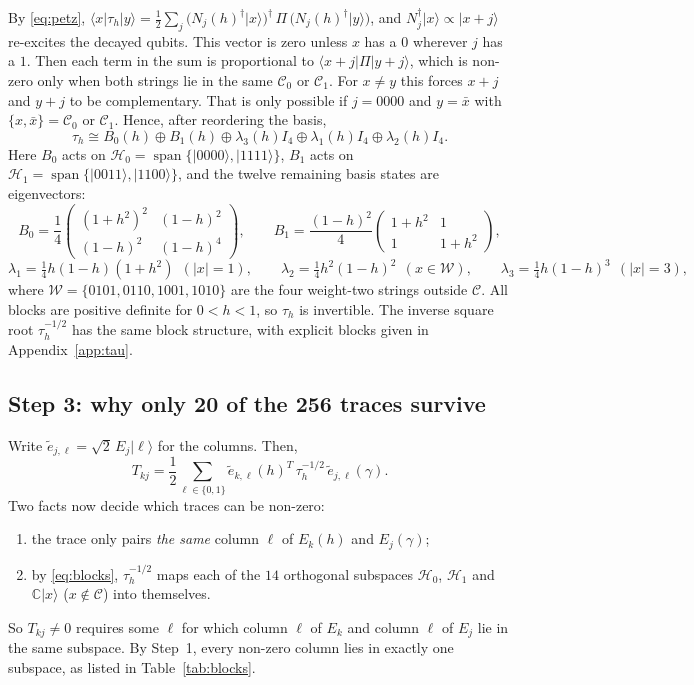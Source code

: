 \documentclass[11pt,a4paper]{article}
\theoremstyle{plain}
\newcommand{\ket}[1]{\lvert #1\rangle}
\newcommand{\bra}[1]{\langle #1\rvert}
\newcommand{\C}{\mathbb{C}}
\newcommand{\cC}{\mathcal{C}}
\newcommand{\cW}{\mathcal{W}}
\newcommand{\cH}{\mathcal{H}}
\newcommand{\wt}[1]{\lvert #1\rvert}
\begin{document}
By \eqref{eq:petz}, $\bra x\tau_h\ket y=\frac12\sum_j\big(N_j(h)^\dagger\ket x\big)^\dagger\,\Pi\,\big(N_j(h)^\dagger\ket y\big)$, and $N_j^\dagger\ket x\propto\ket{x+j}$ re-excites the decayed qubits. This vector is zero unless $x$ has a $0$ wherever $j$ has a $1$. Then each term in the sum is proportional to $\bra{x+j}\Pi\ket{y+j}$, which is non-zero only when both strings lie in the same $\cC_0$ or $\cC_1$. For $x\ne y$ this forces $x+j$ and $y+j$ to be complementary. That is only possible if $j=0000$ and $y=\bar x$ with $\{x,\bar x\}=\cC_0$ or $\cC_1$. Hence, after reordering the basis,
\begin{equation}\label{eq:blocks}
\tau_h\cong B_0(h)\oplus B_1(h)\oplus\lambda_3(h)I_4\oplus\lambda_1(h)I_4\oplus\lambda_2(h)I_4 .
\end{equation}
Here $B_0$ acts on $\cH_0=\operatorname{span}\{\ket{0000},\ket{1111}\}$, $B_1$ acts on $\cH_1=\operatorname{span}\{\ket{0011},\ket{1100}\}$, and the twelve remaining basis states are eigenvectors:
\[
B_0=\frac14\begin{pmatrix}(1+h^2)^2&(1-h)^2\\(1-h)^2&(1-h)^4\end{pmatrix},\qquad
B_1=\frac{(1-h)^2}4\begin{pmatrix}1+h^2&1\\1&1+h^2\end{pmatrix},
\]
\[
\lambda_1=\tfrac14h(1-h)(1+h^2)\ \ (\wt{x}=1),\qquad \lambda_2=\tfrac14h^2(1-h)^2\ \ (x\in\cW),\qquad \lambda_3=\tfrac14h(1-h)^3\ \ (\wt{x}=3),
\]
where $\cW=\{0101,0110,1001,1010\}$ are the four weight-two strings outside $\cC$. All blocks are positive definite for $0<h<1$, so $\tau_h$ is invertible. The inverse square root $\tau_h^{-1/2}$ has the same block structure, with explicit blocks given in Appendix~\ref{app:tau}.

\subsection*{Step 3: why only 20 of the 256 traces survive}

Write $\tilde e_{j,\ell}=\sqrt2\,E_j\ket\ell$ for the columns. Then,
\begin{equation}\label{eq:trace}
T_{kj}=\frac12\sum_{\ell\in\{0,1\}}\tilde e_{k,\ell}(h)^T\,\tau_h^{-1/2}\,\tilde e_{j,\ell}(\gamma).
\end{equation}
Two facts now decide which traces can be non-zero:
\begin{enumerate}
  \item the trace only pairs \emph{the same} column $\ell$ of $E_k(h)$ and $E_j(\gamma)$;
  \item by \eqref{eq:blocks}, $\tau_h^{-1/2}$ maps each of the $14$ orthogonal subspaces $\cH_0$, $\cH_1$ and $\C\ket x$ ($x\notin\cC$) into themselves.
\end{enumerate}
So $T_{kj}\ne0$ requires some $\ell$ for which column $\ell$ of $E_k$ and column $\ell$ of $E_j$ lie in the same subspace. By Step~1, every non-zero column lies in exactly one subspace, as listed in Table~\ref{tab:blocks}.
\end{document}
